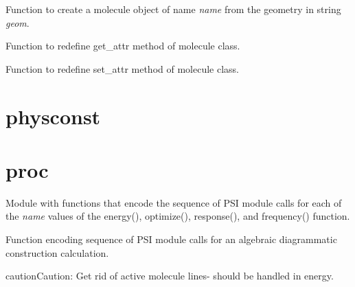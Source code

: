 \documentclass[letterpaper,10pt,english]{sphinxmanual}
\begin{document}

\begin{fulllineitems}
\label{index:molutil.geometry}
Function to create a molecule object of name \emph{name}
from the geometry in string \emph{geom}.

\end{fulllineitems}


\begin{fulllineitems}
\label{index:molutil.new_get_attr}
Function to redefine get\_attr method of molecule class.

\end{fulllineitems}


\begin{fulllineitems}
\label{index:molutil.new_set_attr}
Function to redefine set\_attr method of molecule class.

\end{fulllineitems}



\section{physconst}
\label{index:physconst}\label{index:module-physconst}

\section{proc}
\label{index:proc}\label{index:module-proc}
Module with functions that encode the sequence of PSI module
calls for each of the \emph{name} values of the energy(), optimize(),
response(), and frequency() function.

\begin{fulllineitems}
\label{index:proc.run_adc}
Function encoding sequence of PSI module calls for
an algebraic diagrammatic construction calculation.

\begin{notice}{caution}{Caution:}
Get rid of active molecule lines- should be handled in energy.
\end{notice}

\end{fulllineitems}
\end{document}

